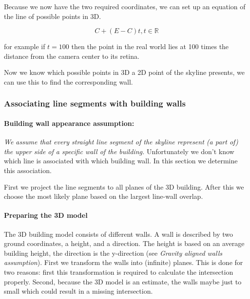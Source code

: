 

	Because we now have the two required coordinates, we can set up an equation of the
	line of possible points in 3D.  

	\[ C + (E-C)t, t \in \mathbb{R} \]

	for example if $t=100$ then the point in the real world lies at 100 times the
		distance from the camera center to its retina.

	Now we know which possible points in 3D a 2D point of the skyline presents,
	we can use this to find the corresponding wall.


\subsubsection{Associating line segments with building walls}
	\paragraph{Building wall appearance assumption:}
	\emph{We assume that every straight line segment of the skyline represent (a part of) the upper side of a specific wall of the building.}
	Unfortunately we don't know which line is associated with which building
	wall. In this section we determine this association.

	First we project the line segments to all planes of the 3D building.  After
	this we choose the most likely plane based on the largest line-wall overlap. 

	\paragraph{Preparing the 3D model}
	The 3D building model consists of different walls. A wall is described by
	two ground coordinates, a height, and a direction.
	The height is based on an average building height, the direction is the
	y-direction (see \emph{Gravity aligned walls assumption}).
	First we transform the walls into (infinite) planes.  This is done for two
	reasons: first this transformation is required to calculate the intersection
	properly. Second, because the 3D model is an estimate, the walls maybe just
	to small which could result in a missing intersection. \\


